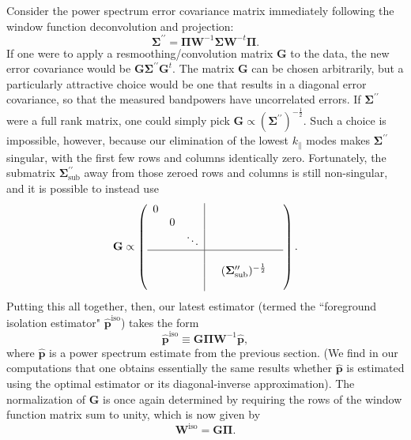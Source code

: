 \documentclass[twocolumn,aps,prd,nofootinbib,showpacs]{revtex4-1}
\begin{document}
Consider the power spectrum error covariance matrix immediately following the window function deconvolution and projection:
\begin{equation}
\boldsymbol \Sigma^{\prime \prime} = \boldsymbol \Pi  \mathbf{W}^{-1} \boldsymbol \Sigma \mathbf{W}^{-t} \boldsymbol \Pi.
\end{equation}
If one were to apply a resmoothing/convolution matrix $\mathbf{G}$ to the data, the new error covariance would be $\mathbf{G} \boldsymbol \Sigma^{\prime \prime} \mathbf{G}^t$.  The matrix $\mathbf{G}$ can be chosen arbitrarily, but a particularly attractive choice would be one that results in a diagonal error covariance, so that the measured bandpowers have uncorrelated errors.  If $\boldsymbol \Sigma^{\prime \prime}$ were a full rank matrix, one could simply pick $\mathbf{G} \propto (\boldsymbol \Sigma^{\prime \prime})^{-\frac{1}{2}}$.  Such a choice is impossible, however, because our elimination of the lowest $k_\parallel$ modes makes $\boldsymbol \Sigma^{\prime \prime}$ singular, with the first few rows and columns identically zero.  Fortunately, the submatrix $\boldsymbol \Sigma^{\prime \prime}_\textrm{sub}$ away from those zeroed rows and columns is still non-singular, and it is possible to instead use
\begin{equation}
\mathbf{G} \propto \left( \begin{array}{ccc|ccc}
0&   & && & \\
& 0 && & &\\
    &  & \ddots & & &\\
  \hline
&  & &&  &   \\
&  & &  & (\boldsymbol \Sigma^{\prime \prime}_\textrm{sub})^{-\frac{1}{2}} &   \\
&  & &  &  &  \\
\end{array}
\right).
\end{equation}
Putting this all together, then, our latest estimator (termed the ``foreground isolation estimator" $\mathbf{\widehat{p}}^\textrm{iso}$) takes the form
\begin{equation}
\mathbf{\widehat{p}}^\textrm{iso} \equiv \mathbf{G} \boldsymbol \Pi \mathbf{W}^{-1} \mathbf{\widehat{p}},
\end{equation}
where $\mathbf{\widehat{p}}$ is a power spectrum estimate from the previous section.  (We find in our computations that one obtains essentially the same results whether $\mathbf{\widehat{p}}$ is estimated using the optimal estimator or its diagonal-inverse approximation).  The normalization of $\mathbf{G}$ is once again determined by requiring the rows of the window function matrix sum to unity, which is now given by
\begin{equation}
\label{eq:IsoWindows}
\mathbf{W}^\textrm{iso} = \mathbf{G} \boldsymbol \Pi.
\end{equation}
\end{document}
